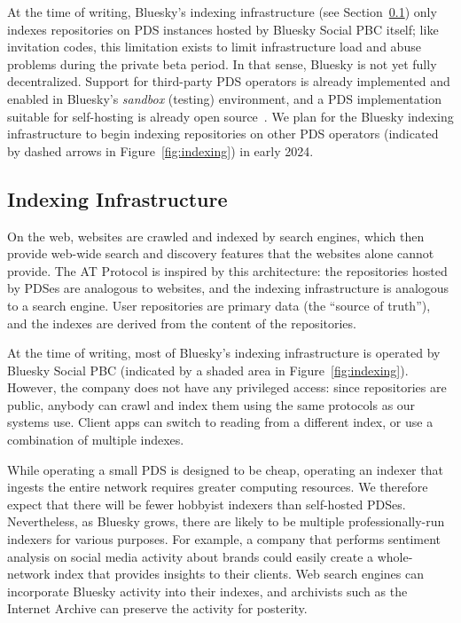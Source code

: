 \documentclass[sigconf,nonacm]{acmart}
\begin{document}
At the time of writing, Bluesky's indexing infrastructure (see Section~\ref{sec:indexing}) only indexes repositories on PDS instances hosted by Bluesky Social PBC itself; like invitation codes, this limitation exists to limit infrastructure load and abuse problems during the private beta period.
In that sense, Bluesky is not yet fully decentralized.
Support for third-party PDS operators is already implemented and enabled in Bluesky's \emph{sandbox} (testing) environment, and a PDS implementation suitable for self-hosting is already open source~\cite{BlueskyGithub}.
We plan for the Bluesky indexing infrastructure to begin indexing repositories on other PDS operators (indicated by dashed arrows in Figure~\ref{fig:indexing}) in early 2024.

\subsection{Indexing Infrastructure}\label{sec:indexing}

On the web, websites are crawled and indexed by search engines, which then provide web-wide search and discovery features that the websites alone cannot provide.
The AT Protocol is inspired by this architecture: the repositories hosted by PDSes are analogous to websites, and the indexing infrastructure is analogous to a search engine.
User repositories are primary data (the ``source of truth''), and the indexes are derived from the content of the repositories.

At the time of writing, most of Bluesky's indexing infrastructure is operated by Bluesky Social PBC (indicated by a shaded area in Figure~\ref{fig:indexing}).
However, the company does not have any privileged access: since repositories are public, anybody can crawl and index them using the same protocols as our systems use.
Client apps can switch to reading from a different index, or use a combination of multiple indexes.

While operating a small PDS is designed to be cheap, operating an indexer that ingests the entire network requires greater computing resources.
We therefore expect that there will be fewer hobbyist indexers than self-hosted PDSes.
Nevertheless, as Bluesky grows, there are likely to be multiple professionally-run indexers for various purposes.
For example, a company that performs sentiment analysis on social media activity about brands could easily create a whole-network index that provides insights to their clients.
Web search engines can incorporate Bluesky activity into their indexes, and archivists such as the Internet Archive can preserve the activity for posterity.
\end{document}
